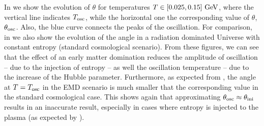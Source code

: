 \documentclass[11pt,a4paper]{article}
\begin{document}
%
In  we show the evolution  of $\theta$ for temperatures $T \in [0.025,0.15]~{\rm GeV}$, where the vertical line indicates $T_{\rm osc}{}$, while the horizontal one the corresponding value of $\theta$, $\theta_{\rm osc}{}$. Also, the blue curve connects the peaks of the oscillation. For comparison, in  we also show the evolution of the angle in a radiation dominated Universe with constant entropy (\ie standard cosmological scenario). From these figures, we can see that the effect of an early matter domination reduces the amplitude of oscillation -- due to the injection of entropy -- as well the oscillation temperature -- due to the increase of the Hubble parameter. Furthermore, as expected from , the angle at $T=T_{\rm osc}{}$ in the EMD scenario is much smaller that the corresponding value in the standard cosmological case. This shows again that approximating $\theta_{\rm osc}{} \approx \theta_{\rm ini}{}$ results in an inaccurate result, especially in cases where entropy is injected to the plasma (as expected by ).
\end{document}
